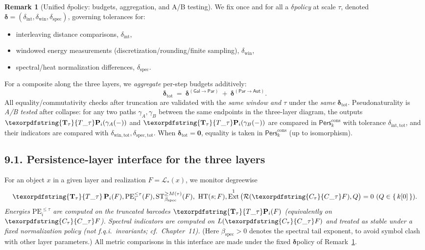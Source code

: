 \documentclass[11pt]{article}
\DeclareMathOperator{\Ext}{Ext}
\DeclareRobustCommand{\hyp}{\nobreakdash-}
\newcommand{\Pers}{\mathsf{Pers}}
\newcommand{\Rfun}{\mathcal{R}}
\numberwithin{equation}{section}
\theoremstyle{definition}
\newtheorem{remark}[theorem]{Remark}
\DeclareRobustCommand{\Perskft}{\Pers^{\mathrm{cons}}_{k}}
\DeclareRobustCommand{\Ttau}{\texorpdfstring{\ensuremath{\mathbf{T}_{\tau}}}{T\_\tau}}
\DeclareRobustCommand{\Ctau}{\texorpdfstring{\ensuremath{C_{\tau}}}{C\_\tau}}
\DeclareRobustCommand{\Qtest}{\{\,k[0]\,\}}
\providecommand{\n}{\unskip\space}
\begin{document}
\begin{remark}[Unified \(\delta\)\nobreakdash policy: budgets, aggregation, and A/B testing]\label{rk:9-delta-policy}
We fix once and for all a \emph{\(\delta\)\nobreakdash policy} at scale \(\tau\), denoted \(\boldsymbol{\delta}=(\delta_{\mathrm{int}},\delta_{\mathrm{win}},\delta_{\mathrm{spec}})\), governing tolerances for:
\begin{itemize}
  \item interleaving distance comparisons, \(\delta_{\mathrm{int}}\),
  \item windowed energy measurements (discretization/rounding/finite sampling), \(\delta_{\mathrm{win}}\),
  \item spectral/heat normalization differences, \(\delta_{\mathrm{spec}}\).
\end{itemize}
For a composite along the three layers, we \emph{aggregate} per\hyp step budgets additively:
\[
\boldsymbol{\delta}_{\mathrm{tot}}\ =\ \boldsymbol{\delta}^{(\mathsf{Gal}\to\mathsf{Par})}\ +\ \boldsymbol{\delta}^{(\mathsf{Par}\to\mathsf{Aut})}.
\]
All equality/commutativity checks after truncation are validated with the \emph{same window and \(\tau\)} under the \emph{same} \(\boldsymbol{\delta}_{\mathrm{tot}}\).
Pseudonaturality is \emph{A/B tested} after collapse: for any two paths \(\gamma_A,\gamma_B\) between the same endpoints in the three\hyp layer diagram, the outputs
\(\Ttau\mathbf{P}_i(\gamma_A(-))\) and \(\Ttau\mathbf{P}_i(\gamma_B(-))\) are compared in \(\Perskft\) with tolerance \(\delta_{\mathrm{int,tot}}\), and their indicators are compared with \(\delta_{\mathrm{win,tot}},\delta_{\mathrm{spec,tot}}\).
When \(\boldsymbol{\delta}_{\mathrm{tot}}=\mathbf{0}\), equality is taken in \(\Perskft\) (up to isomorphism).
\end{remark}

\subsection*{9.1. Persistence\hyp layer interface for the three layers}
For an object \(x\) in a given layer and realization \(F=\mathcal{L}_{\ast}(x)\), we monitor degreewise
\[
\Ttau\,\mathbf{P}_i(F),\qquad\n\mathrm{PE}_i^{\le \tau}(F),\qquad\n\mathrm{ST}_{\beta_{\mathrm{spec}}}^{\ge M(\tau)}(F),\ \mathrm{HT}(s;F),\qquad\n\Ext^1\big(\Rfun(\Ctau F),Q\big)=0\ (Q\in\Qtest).
\]
\emph{Energies \(\mathrm{PE}_i^{\le\tau}\) are computed on the truncated barcodes \(\Ttau\mathbf{P}_i(F)\) (equivalently on \(\Ctau F\)).
Spectral indicators are computed on \(L(\Ctau F)\) and treated as \emph{stable under a fixed normalization policy} (not f.q.i.\ invariants; cf.\ Chapter~11).}
(Here \(\beta_{\mathrm{spec}}>0\) denotes the spectral tail exponent, to avoid symbol clash with other layer parameters.)
All metric comparisons in this interface are made under the fixed \(\boldsymbol{\delta}\)\nobreakdash policy of Remark~\ref{rk:9-delta-policy}.
\end{document}
